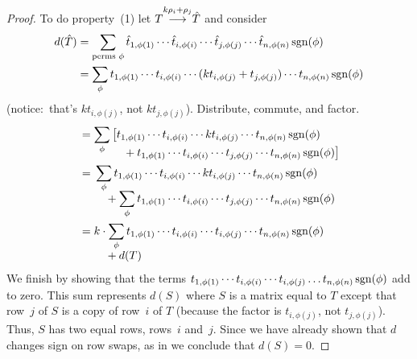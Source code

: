 \begin{proof}
To do property~(1) let \( T\smash[b]{\mathrel{ \mathop{\longrightarrow}\limits^{k\rho_i+\rho_j\mathstrut}_{ \begin{subarray}{l} \relax \end{subarray}}}}\hat{T} \)
and consider
\begin{align*}
  d(\hat{T})
  &=\sum_{\text{perms\ }\phi}
    \hat{t}_{1,\phi(1)}\cdots\hat{t}_{i,\phi(i)}
    \cdots\hat{t}_{j,\phi(j)}\cdots\hat{t}_{n,\phi(n)}
                                 \operatorname{sgn}(\phi)                \\
  &=\sum_{\phi}
    t_{1,\phi(1)}\cdots t_{i,\phi(i)}
    \cdots (kt_{i,\phi(j)}+t_{j,\phi(j)})\cdots t_{n,\phi(n)}
                                 \operatorname{sgn}(\phi)
\end{align*}
(notice:~that's 
\( kt_{i,\phi(j)} \), not \( kt_{j,\phi(j)} \)).
Distribute, commute, and factor.
\begin{align*}
  &=\sum_{\phi} 
      \begin{aligned}[t]
        &\big[t_{1,\phi(1)}\cdots t_{i,\phi(i)}
          \cdots kt_{i,\phi(j)}\cdots t_{n,\phi(n)}
                                 \operatorname{sgn}(\phi)         \\
        &\hbox{}\quad\hbox{}
           +t_{1,\phi(1)}\cdots t_{i,\phi(i)}
           \cdots t_{j,\phi(j)}\cdots t_{n,\phi(n)}
                                 \operatorname{sgn}(\phi)\big]
      \end{aligned}                                               \\
  &=\begin{aligned}[t] 
         &\sum_{\smash{\phi}} t_{1,\phi(1)}\cdots t_{i,\phi(i)}
            \cdots kt_{i,\phi(j)}\cdots t_{n,\phi(n)}
                                 \operatorname{sgn}(\phi)           \\[-1ex]               
         &\hbox{}\quad\hbox{}
            +\sum_{\phi}
            t_{1,\phi(1)}\cdots t_{i,\phi(i)}
            \cdots t_{j,\phi(j)}\cdots t_{n,\phi(n)}
                                 \operatorname{sgn}(\phi)        
     \end{aligned}                                               \\
  &=\begin{aligned}[t]
       &k\cdot \sum_{\smash{\phi}}
            t_{1,\phi(1)}\cdots t_{i,\phi(i)}
            \cdots t_{i,\phi(j)}\cdots t_{n,\phi(n)}
                                 \operatorname{sgn}(\phi)          \\[-.75ex]
       &\hbox{}\quad\hbox{}
             +d(T)          
     \end{aligned}
\end{align*}
We finish by showing that the terms
\( t_{1,\phi(1)}\cdots t_{i,\phi(i)} \cdots t_{i,\phi(j)}\dots t_{n,\phi(n)}
   \operatorname{sgn}(\phi)  \) add to zero.
This sum represents \( d(S) \) where \( S \) is a matrix equal to  \( T \)
except that row~$j$ of $S$ is a copy of row~$i$ of $T$ 
(because the factor is \( t_{i,\phi(j)} \), not \( t_{j,\phi(j)} \)).
Thus, $S$ has two equal rows, rows~$i$ and~$j$.
Since we have already shown that $d$ changes sign on row swaps,
as in  we conclude that $d(S)=0$.
\end{proof}


